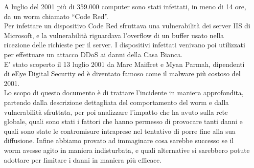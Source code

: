 A luglio del 2001 più di 359.000 computer sono stati infettati, in meno di 14 ore, da un worm chiamato “Code Red”.\\
Per infettare un dispositivo Code Red sfruttava una vulnerabilità dei server IIS di Microsoft, e la vulnerabilità riguardava l’overflow di un buffer usato nella ricezione delle richieste per il server. I dispositivi infettati venivano poi utilizzati per effettuare un attacco DDoS ai danni della Casa Bianca.\\
E’ stato scoperto il 13 luglio 2001 da Marc Maiffret e Myan Parmah, dipendenti di eEye Digital Security ed è diventato famoso come il malware più costoso del 2001.\\
Lo scopo di questo documento è di trattare l'incidente in maniera approfondita, partendo dalla descrizione dettagliata del comportamento del worm e dalla vulnerabilità sfruttata, per poi analizzare l'impatto che ha avuto sulla rete globale, quali sono stati i fattori che hanno permesso di provocare tanti danni e quali sono state le contromisure intraprese nel tentativo di porre fine alla sua diffusione. Infine abbiamo provato ad immaginare cosa sarebbe successo se il worm avesse agito in maniera indisturbata, e quali alternative si sarebbero potute adottare per limitare i danni in maniera più efficace.\\
